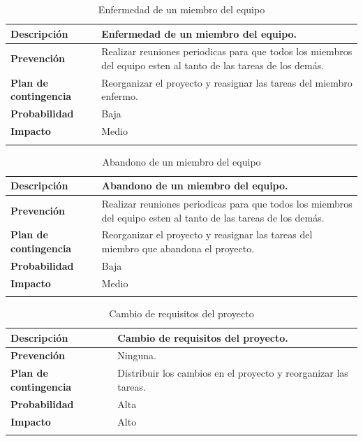 \documentclass{report}
\begin{document}
        \begin{center}
            \begin{longtable}{|p{6cm}|p{6cm}|}
                \hline
                \textbf{Descripción} & Enfermedad de un miembro del equipo.\\
                \hline
                \textbf{Prevención} & Realizar reuniones periodicas para que todos los miembros del equipo esten al tanto de las tareas de los demás.\\
                \hline
                \textbf{Plan de contingencia} & Reorganizar el proyecto y reasignar las tareas del miembro enfermo.\\
                \hline
                \textbf{Probabilidad} & Baja\\
                \hline
                \textbf{Impacto} & Medio\\
                \hline
                \caption{Enfermedad de un miembro del equipo}
            \end{longtable}
        \end{center}
        \begin{center}
            \begin{longtable}{|p{6cm}|p{6cm}|}
                \hline
                \textbf{Descripción} & Abandono de un miembro del equipo.\\
                \hline
                \textbf{Prevención} & Realizar reuniones periodicas para que todos los miembros del equipo esten al tanto de las tareas de los demás.\\
                \hline
                \textbf{Plan de contingencia} & Reorganizar el proyecto y reasignar las tareas del miembro que abandona el proyecto.\\
                \hline
                \textbf{Probabilidad} & Baja\\
                \hline
                \textbf{Impacto} & Medio\\
                \hline
                \caption{Abandono de un miembro del equipo}
            \end{longtable}
        \end{center}
        \clearpage
        \begin{center}
            \begin{longtable}{|p{6cm}|p{6cm}|}
                \hline
                \textbf{Descripción} & Cambio de requisitos del proyecto.\\
                \hline
                \textbf{Prevención} & Ninguna.\\
                \hline
                \textbf{Plan de contingencia} & Distribuir los cambios en el proyecto y reorganizar las tareas.\\
                \hline
                \textbf{Probabilidad} & Alta\\
                \hline
                \textbf{Impacto} & Alto\\
                \hline
                \caption{Cambio de requisitos del proyecto}
            \end{longtable}
        \end{center}
\end{document}
